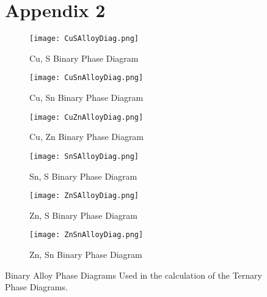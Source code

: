 \begin{figure}[t]
\chapter{Appendix 2}
\centering
\begin{subfigure}{70mm}
  \centering
    \texttt{[image: CuSAlloyDiag.png]}
    \caption{Cu, S Binary Phase Diagram\citep{Hay2000}}
    \label{fig:CuS}
\end{subfigure}%
\begin{subfigure}{70mm}
 \centering
    \texttt{[image: CuSnAlloyDiag.png]}
    \caption{Cu, Sn Binary Phase Diagram\citep{Hay2000}}
    \label{fig:CuSn}
\end{subfigure}
\begin{subfigure}{70mm}
 \centering
    \texttt{[image: CuZnAlloyDiag.png]}
    \caption{Cu, Zn Binary Phase Diagram\citep{Hay2000}}
    \label{fig:CuZn}
\end{subfigure}
\begin{subfigure}{70mm}
 \centering
    \texttt{[image: SnSAlloyDiag.png]}
    \caption{Sn, S Binary Phase Diagram\citep{Hay2000}}
    \label{fig:SnS}
\end{subfigure}
\begin{subfigure}{70mm}
 \centering
    \texttt{[image: ZnSAlloyDiag.png]}
    \caption{Zn, S Binary Phase Diagram\citep{Sharma1996}}
    \label{fig:ZnS}
\end{subfigure}
\begin{subfigure}{70mm}
 \centering
    \texttt{[image: ZnSnAlloyDiag.png]}
    \caption{Zn, Sn Binary Phase Diagram\citep{Hay2000}}
    \label{fig:ZnSn}
\end{subfigure}
\caption{Binary Alloy Phase Diagrams Used in the calculation of the Ternary Phase Diagrams.}
\label{fig:BinaryAlloyPhaseDiagrams}
\end{figure}